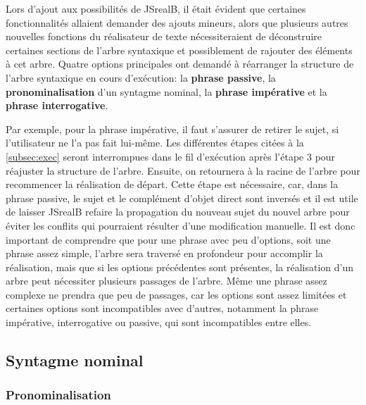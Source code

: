 \documentclass[11pt]{article} %
\newcommand{\system}[1]{\textsf{#1}}
\newcommand{\JSB}{\system{JSrealB}}
\begin{document}
Lors d'ajout aux possibilités de \JSB{}, il était évident
que certaines fonctionnalités allaient demander des ajouts mineurs,
alors que plusieurs autres nouvelles fonctions du réalisateur de texte nécessiteraient
de déconstruire certaines sections de l'arbre syntaxique et possiblement
de rajouter des éléments à cet arbre. Quatre options principales ont
demandé à réarranger la structure de l'arbre syntaxique en cours d'exécution:
la \textbf{phrase passive}, la \textbf{pronominalisation} d'un syntagme
nominal, la \textbf{phrase impérative} et la \textbf{phrase interrogative}.


Par exemple, pour la phrase impérative, il faut s'assurer de retirer
le sujet, si l'utilisateur ne l'a pas fait lui-même. Les différentes
étapes citées à la \autoref{subsec:exec} seront interrompues dans le fil d'exécution
après l'étape 3 pour réajuster la structure de l'arbre. Ensuite, on
retournera à la racine de l'arbre pour recommencer la réalisation
de départ. Cette étape est nécessaire, car, dans la phrase passive,
le sujet et le complément d'objet direct sont inversés et il est utile
de laisser \JSB{} refaire la propagation du nouveau sujet du nouvel
arbre pour éviter les conflits qui pourraient résulter d'une modification
manuelle. Il est donc important de comprendre que pour une phrase
avec peu d'options, soit une phrase assez simple, l'arbre sera traversé
en profondeur pour accomplir la réalisation, mais que si les options
précédentes sont présentes, la réalisation d'un arbre peut nécessiter
plusieurs passages de l'arbre. Même une phrase assez complexe
ne prendra que peu de passages, car les options sont assez limitées
et certaines options sont incompatibles avec d'autres, notamment la
phrase impérative, interrogative ou passive, qui sont incompatibles
entre elles.

\subsection{Syntagme nominal}

\subsubsection{Pronominalisation}
\label{pronomi}
\end{document}
